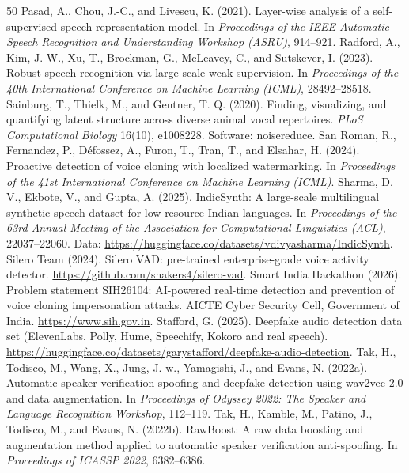 \documentclass[10pt,a4paper,twocolumn]{article}
\begin{document}
\begin{thebibliography}{50}
 Pasad, A., Chou, J.-C., and Livescu, K. (2021). Layer-wise analysis of a self-supervised speech representation model. In \emph{Proceedings of the IEEE Automatic Speech Recognition and Understanding Workshop (ASRU)}, 914--921.
 Radford, A., Kim, J. W., Xu, T., Brockman, G., McLeavey, C., and Sutskever, I. (2023). Robust speech recognition via large-scale weak supervision. In \emph{Proceedings of the 40th International Conference on Machine Learning (ICML)}, 28492--28518.
 Sainburg, T., Thielk, M., and Gentner, T. Q. (2020). Finding, visualizing, and quantifying latent structure across diverse animal vocal repertoires. \emph{PLoS Computational Biology} 16(10), e1008228. Software: noisereduce.
 San Roman, R., Fernandez, P., D\'efossez, A., Furon, T., Tran, T., and Elsahar, H. (2024). Proactive detection of voice cloning with localized watermarking. In \emph{Proceedings of the 41st International Conference on Machine Learning (ICML)}.
 Sharma, D. V., Ekbote, V., and Gupta, A. (2025). IndicSynth: A large-scale multilingual synthetic speech dataset for low-resource Indian languages. In \emph{Proceedings of the 63rd Annual Meeting of the Association for Computational Linguistics (ACL)}, 22037--22060. Data: \url{https://huggingface.co/datasets/vdivyasharma/IndicSynth}.
 Silero Team (2024). Silero VAD: pre-trained enterprise-grade voice activity detector. \url{https://github.com/snakers4/silero-vad}.
 Smart India Hackathon (2026). Problem statement SIH26104: AI-powered real-time detection and prevention of voice cloning impersonation attacks. AICTE Cyber Security Cell, Government of India. \url{https://www.sih.gov.in}.
 Stafford, G. (2025). Deepfake audio detection data set (ElevenLabs, Polly, Hume, Speechify, Kokoro and real speech). \url{https://huggingface.co/datasets/garystafford/deepfake-audio-detection}.
 Tak, H., Todisco, M., Wang, X., Jung, J.-w., Yamagishi, J., and Evans, N. (2022a). Automatic speaker verification spoofing and deepfake detection using wav2vec 2.0 and data augmentation. In \emph{Proceedings of Odyssey 2022: The Speaker and Language Recognition Workshop}, 112--119.
 Tak, H., Kamble, M., Patino, J., Todisco, M., and Evans, N. (2022b). RawBoost: A raw data boosting and augmentation method applied to automatic speaker verification anti-spoofing. In \emph{Proceedings of ICASSP 2022}, 6382--6386.

\end{thebibliography}
\end{document}
